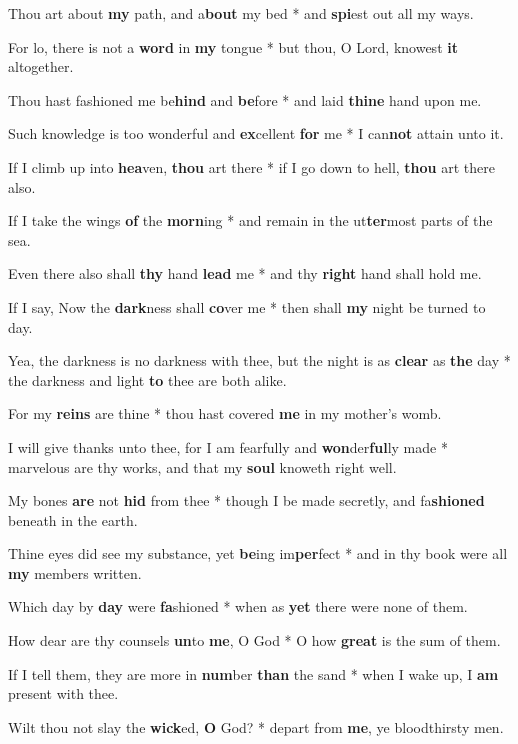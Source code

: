 \begin{multicols}{2}
	Thou art about \textbf{my} path, and a\textbf{bout} my bed * and \textbf{spi}est out all my ways.
	
	For lo, there is not a \textbf{word} in \textbf{my} tongue * but thou, O Lord, knowest \textbf{it} altogether.
	
	Thou hast fashioned me be\textbf{hind} and \textbf{be}fore * and laid \textbf{thine} hand upon me.
	
	Such knowledge is too wonderful and \textbf{ex}cellent \textbf{for} me * I can\textbf{not} attain unto it.
	
	If I climb up into \textbf{hea}ven, \textbf{thou} art there * if I go down to hell, \textbf{thou} art there also.
	
	If I take the wings \textbf{of} the \textbf{morn}ing * and remain in the ut\textbf{ter}most parts of the sea.
	
	Even there also shall \textbf{thy} hand \textbf{lead} me * and thy \textbf{right} hand shall hold me.
	
	If I say, Now the \textbf{dark}ness shall \textbf{co}ver me * then shall \textbf{my} night be turned to day.
	
	Yea, the darkness is no darkness with thee, but the night is as \textbf{clear} as \textbf{the} day * the darkness and light \textbf{to} thee are both alike.
	
	For my \textbf{reins} are thine * thou hast covered \textbf{me} in my mother's womb.
	
	I will give thanks unto thee, for I am fearfully and \textbf{won}der\textbf{ful}ly made * marvelous are thy works, and that my \textbf{soul} knoweth right well.
	
	My bones \textbf{are} not \textbf{hid} from thee * though I be made secretly, and fa\textbf{shioned} beneath in the earth.
	
	Thine eyes did see my substance, yet \textbf{be}ing im\textbf{per}fect * and in thy book were all \textbf{my} members written.
	
	Which day by \textbf{day} were \textbf{fa}shioned * when as \textbf{yet} there were none of them.
	
	How dear are thy counsels \textbf{un}to \textbf{me}, O God * O how \textbf{great} is the sum of them.
	
	If I tell them, they are more in \textbf{num}ber \textbf{than} the sand * when I wake up, I \textbf{am} present with thee.
	
	Wilt thou not slay the \textbf{wick}ed, \textbf{O} God? * depart from \textbf{me}, ye bloodthirsty men.
	

\end{multicols}
